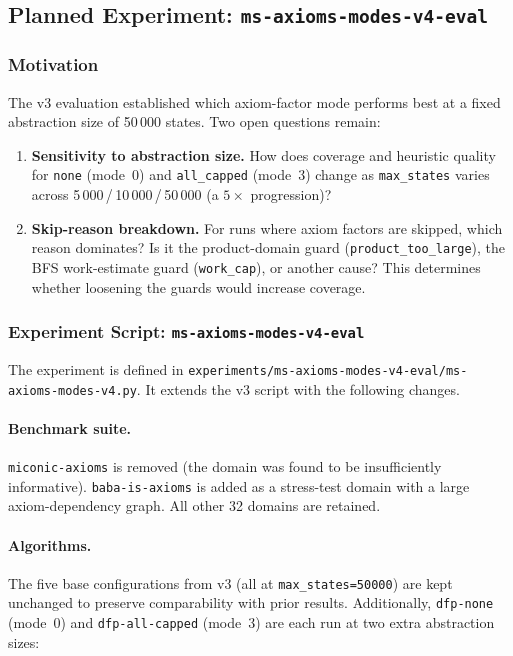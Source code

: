 \documentclass[11pt,a4paper]{article}
\begin{document}
\subsection{Planned Experiment: \texttt{ms-axioms-modes-v4-eval}}
\label{sec:v4-experiment}

\subsubsection*{Motivation}

The v3 evaluation established which axiom-factor mode performs best at a fixed
abstraction size of 50\,000 states.  Two open questions remain:

\begin{enumerate}
  \item \textbf{Sensitivity to abstraction size.}  How does coverage and
        heuristic quality for \texttt{none} (mode~0) and \texttt{all\_capped}
        (mode~3) change as \texttt{max\_states} varies across
        5\,000\,/\,10\,000\,/\,50\,000 (a $5\times$ progression)?

  \item \textbf{Skip-reason breakdown.}  For runs where axiom factors are
        skipped, which reason dominates?  Is it the product-domain guard
        (\texttt{product\_too\_large}), the BFS work-estimate guard
        (\texttt{work\_cap}), or another cause?  This determines whether
        loosening the guards would increase coverage.
\end{enumerate}

\subsubsection*{Experiment Script: \texttt{ms-axioms-modes-v4-eval}}

The experiment is defined in
\texttt{experiments/ms-axioms-modes-v4-eval/ms-axioms-modes-v4.py}.
It extends the v3 script with the following changes.

\paragraph{Benchmark suite.}
\texttt{miconic-axioms} is removed (the domain was found to be insufficiently
informative).  \texttt{baba-is-axioms} is added as a stress-test domain with
a large axiom-dependency graph.  All other 32 domains are retained.

\paragraph{Algorithms.}
The five base configurations from v3 (all at \texttt{max\_states=50000}) are
kept unchanged to preserve comparability with prior results.  Additionally,
\texttt{dfp-none} (mode~0) and \texttt{dfp-all-capped} (mode~3) are each run
at two extra abstraction sizes:
\end{document}
